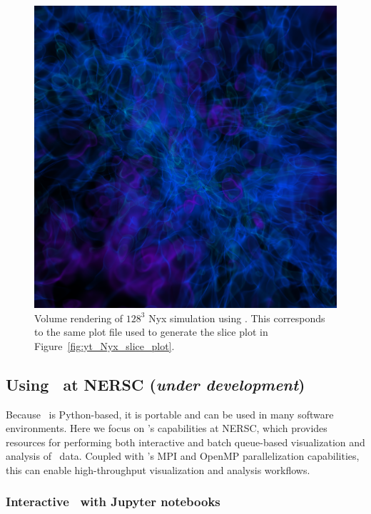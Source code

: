 \begin{figure}
  \includegraphics[scale=1.0]{./Visualization/yt_Nyx_density_vol_rend.png}
  \caption{Volume rendering of $128^3$ Nyx simulation using \yt. This
           corresponds to the same plot file used to generate the slice plot in
           Figure~\ref{fig:yt_Nyx_slice_plot}.}
  \label{fig:yt_Nyx_vol_rend}
\end{figure}

\subsection{Using \yt\ at NERSC (\emph{under development})}

Because \yt\ is Python-based, it is portable and can be used in many software
environments. Here we focus on \yt's capabilities at NERSC, which provides
resources for performing both interactive and batch queue-based visualization
and analysis of \amrex\ data. Coupled with \yt's MPI and OpenMP parallelization
capabilities, this can enable high-throughput visualization and analysis
workflows.

\subsubsection{Interactive \yt\ with Jupyter notebooks}


